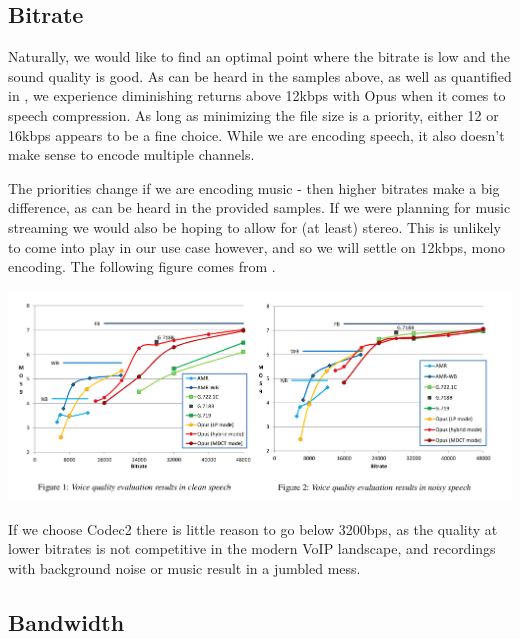 \documentclass{article}
\begin{document}
\subsection{Bitrate}



Naturally, we would like to find an optimal point where the bitrate is low and the sound quality is good. As can be heard in the samples above, as well as quantified in \cite{opuscomp2}, we experience diminishing returns above 12kbps with Opus when it comes to speech compression. As long as minimizing the file size is a priority, either 12 or 16kbps appears to be a fine choice. While we are encoding speech, it also doesn't make sense to encode multiple channels. 

The priorities change if we are encoding music - then higher bitrates make a big difference, as can be heard in the provided samples. If we were planning for music streaming we would also be hoping to allow for (at least) stereo. This is unlikely to come into play in our use case however, and so we will settle on 12kbps, mono encoding. The following figure comes from \cite{opuscomp2}.

\begin{center}
    \includegraphics[width=\textwidth]{image.png}
\end{center}

If we choose Codec2 there is little reason to go below 3200bps, as the quality at lower bitrates is not competitive in the modern VoIP landscape, and recordings with background noise or music result in a jumbled mess.

\subsection{Bandwidth}
\end{document}
